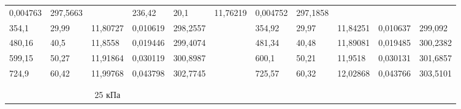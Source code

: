 \documentclass[12pt,a4paper]{article}
\begin{document}
\begin{enumerate}
{\begin{table}[p]
{\begin{tabular}{lllllllllll}
							\multicolumn{1}{l|}{0,004763} &
							\multicolumn{1}{l|}{297,5663} &
							\multicolumn{1}{l|}{} &
							\multicolumn{1}{l|}{236,42} &
							\multicolumn{1}{l|}{20,1} &
							\multicolumn{1}{l|}{11,76219} &
							\multicolumn{1}{l|}{0,004752} &
							\multicolumn{1}{l|}{297,1858} \\ \cline{1-5} \cline{7-11} 
							\multicolumn{1}{|l|}{354,1} &
							\multicolumn{1}{l|}{29,99} &
							\multicolumn{1}{l|}{11,80727} &
							\multicolumn{1}{l|}{0,010619} &
							\multicolumn{1}{l|}{298,2557} &
							\multicolumn{1}{l|}{} &
							\multicolumn{1}{l|}{354,92} &
							\multicolumn{1}{l|}{29,97} &
							\multicolumn{1}{l|}{11,84251} &
							\multicolumn{1}{l|}{0,010637} &
							\multicolumn{1}{l|}{299,092} \\ \cline{1-5} \cline{7-11} 
							\multicolumn{1}{|l|}{480,16} &
							\multicolumn{1}{l|}{40,5} &
							\multicolumn{1}{l|}{11,8558} &
							\multicolumn{1}{l|}{0,019446} &
							\multicolumn{1}{l|}{299,4074} &
							\multicolumn{1}{l|}{} &
							\multicolumn{1}{l|}{481,34} &
							\multicolumn{1}{l|}{40,48} &
							\multicolumn{1}{l|}{11,89081} &
							\multicolumn{1}{l|}{0,019485} &
							\multicolumn{1}{l|}{300,2382} \\ \cline{1-5} \cline{7-11} 
							\multicolumn{1}{|l|}{599,15} &
							\multicolumn{1}{l|}{50,27} &
							\multicolumn{1}{l|}{11,91864} &
							\multicolumn{1}{l|}{0,030119} &
							\multicolumn{1}{l|}{300,8987} &
							\multicolumn{1}{l|}{} &
							\multicolumn{1}{l|}{600,1} &
							\multicolumn{1}{l|}{50,21} &
							\multicolumn{1}{l|}{11,9518} &
							\multicolumn{1}{l|}{0,030131} &
							\multicolumn{1}{l|}{301,6857} \\ \cline{1-5} \cline{7-11} 
							\multicolumn{1}{|l|}{724,9} &
							\multicolumn{1}{l|}{60,42} &
							\multicolumn{1}{l|}{11,99768} &
							\multicolumn{1}{l|}{0,043798} &
							\multicolumn{1}{l|}{302,7745} &
							\multicolumn{1}{l|}{} &
							\multicolumn{1}{l|}{725,57} &
							\multicolumn{1}{l|}{60,32} &
							\multicolumn{1}{l|}{12,02868} &
							\multicolumn{1}{l|}{0,043766} &
							\multicolumn{1}{l|}{303,5101} \\ \cline{1-5} \cline{7-11} 
							&
							&
							&
							&
							&
							&
							&
							&
							&
							&
							\\
							&
							&
							&
							&
							&
							&
							&
							&
							&
							&
							\\ \cline{1-5}
							\multicolumn{5}{|c|}{25 кПа} &

\end{tabular}}
\end{table}}
\end{enumerate}
\end{document}
